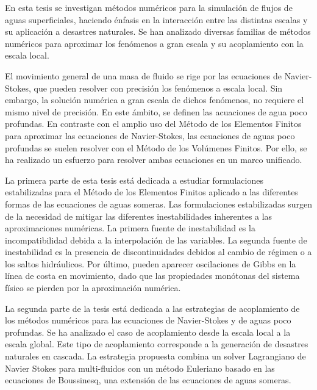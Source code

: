 \documentclass[
11pt,                   %
english,                %
singlespacing,          %
headsepline,            %
]{MastersDoctoralThesis}
\begin{document}

\begin{resumen}
En esta tesis se investigan métodos numéricos para la simulación de flujos de aguas superficiales, haciendo énfasis en la interacción entre las distintas escalas y su aplicación a desastres naturales. Se han analizado diversas familias de métodos numéricos para aproximar los fenómenos a gran escala y su acoplamiento con la escala local.

El movimiento general de una masa de fluido se rige por las ecuaciones de Navier-Stokes, que pueden resolver con precisión los fenómenos a escala local. Sin embargo, la solución numérica a gran escala de dichos fenómenos, no requiere el mismo nivel de precisión. En este ámbito, se definen las acuaciones de agua poco profundas. En contraste con el amplio uso del Método de los Elementos Finitos para aproximar las ecuaciones de Navier-Stokes, las ecuaciones de aguas poco profundas se suelen resolver con el Método de los Volúmenes Finitos. Por ello, se ha realizado un esfuerzo para resolver ambas ecuaciones en un marco unificado.

La primera parte de esta tesis está dedicada a estudiar formulaciones estabilizadas para el Método de los Elementos Finitos aplicado a las diferentes formas de las ecuaciones de aguas someras. Las formulaciones estabilizadas surgen de la necesidad de mitigar las diferentes inestabilidades inherentes a las aproximaciones numéricas. La primera fuente de inestabilidad es la incompatibilidad debida a la interpolación de las variables. La segunda fuente de inestabilidad es la presencia de discontinuidades debidos al cambio de régimen o a los saltos hidráulicos. Por último, pueden aparecer oscilaciones de Gibbs en la línea de costa en movimiento, dado que las propiedades monótonas del sistema físico se pierden por la aproximación numérica.

La segunda parte de la tesis está dedicada a las estrategias de acoplamiento de los métodos numéricos para las ecuaciones de Navier-Stokes y de aguas poco profundas. Se ha analizado el caso de acoplamiento desde la escala local a la escala global. Este tipo de acoplamiento corresponde a la generación de desastres naturales en cascada. La estrategia propuesta combina un solver Lagrangiano de Navier Stokes para multi-fluidos con un método Euleriano basado en las ecuaciones de Boussinesq, una extensión de las ecuaciones de aguas someras.


\end{resumen}
\end{document}
